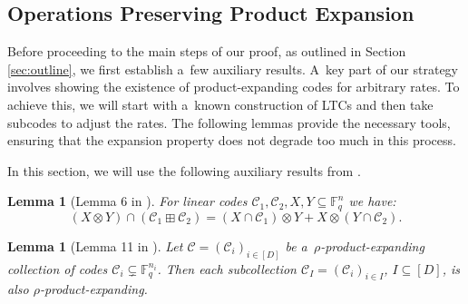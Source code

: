 \documentclass[conference]{IEEEtran}
\theoremstyle{plain}
\newtheorem{extlemma}[exttheorem]{Lemma}
\theoremstyle{definition}
\theoremstyle{remark}
\newcommand{\cC}{\mathcal{C}}
\newcommand{\F}{\mathbb{F}}
\begin{document}
\subsection{Operations Preserving Product Expansion}

Before proceeding to the main steps of our proof, as outlined in Section \ref{sec:outline}, we first establish a~few auxiliary results. A~key part of our strategy involves showing the existence of product-expanding codes for arbitrary rates. To achieve this, we will start with a~known construction of LTCs and then take subcodes to adjust the rates. The following lemmas provide the necessary tools, ensuring that the expansion property does not degrade too much in this process.

In this section, we will use the following auxiliary results from \cite{kalachevTwosidedRobustlyTestable2023}.
\begin{extlemma}[Lemma 6 in \cite{kalachevTwosidedRobustlyTestable2023}]\label{lemma:intersection}
    For linear codes $\cC_1,\cC_2,X,Y\subseteq \F_q^n$ we have: 
    $$(X\otimes Y)\cap (\cC_1\boxplus \cC_2)=(X\cap \cC_1)\otimes Y+X\otimes (Y\cap \cC_2).$$
\end{extlemma}

\begin{extlemma}[Lemma 11 in \cite{kalachevTwosidedRobustlyTestable2023}]\label{lemma:subset-exp}
Let $\cC=(\cC_i)_{i\in [D]}$ be a~$\rho$-product-expanding collection of codes $\cC_i\subsetneq \F_q^{n_i}$. Then each subcollection $\cC_I=(\cC_i)_{i\in I}$, $I\subseteq [D]$, is also $\rho$-product-expanding.
\end{extlemma}
\end{document}
